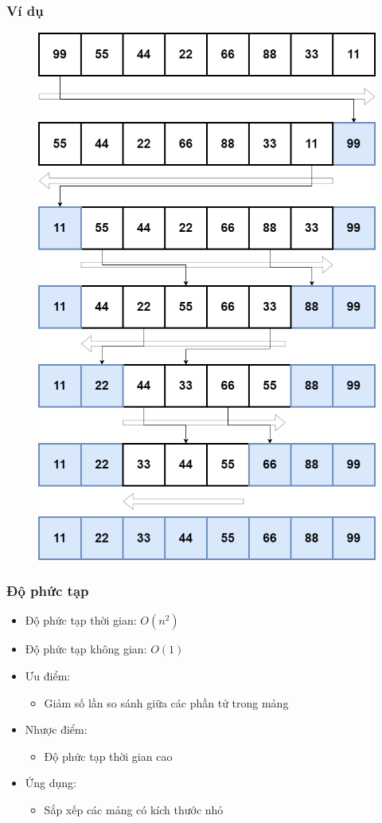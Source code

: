 \subsubsection{Ví dụ}
\begin{figure}[H]
    \centering
    \includegraphics[width=0.75\linewidth]{img/shaker_sort/1.png}
\end{figure}

\subsubsection{Độ phức tạp}

\begin{itemize}
    \item Độ phức tạp thời gian: $O(n^2)$
    \item Độ phức tạp không gian: $O(1)$
    \item Ưu điểm:
        \begin{itemize}
            \item Giảm số lần so sánh giữa các phần tử trong mảng
        \end{itemize}
    \item Nhược điểm:
        \begin{itemize}
            \item Độ phức tạp thời gian cao
        \end{itemize}
    \item Ứng dụng:
        \begin{itemize}
            \item Sắp xếp các mảng có kích thước nhỏ
        \end{itemize}
\end{itemize}
